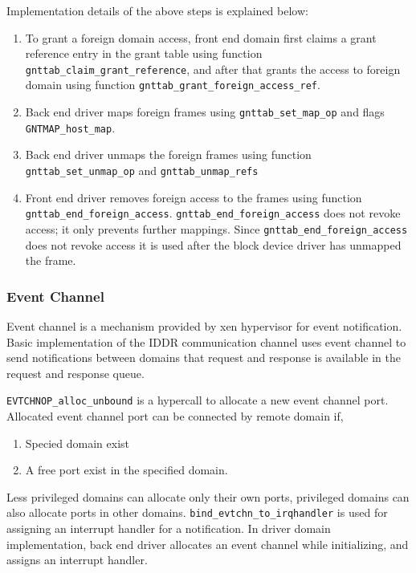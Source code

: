 Implementation details of the above steps is explained below: 
\begin{enumerate}
\item To grant a foreign domain access, front end domain first claims a grant reference entry in the grant table using function \texttt{gnttab\_claim\_grant\_reference}, and after that grants the access to foreign domain using function \texttt{gnttab\_grant\_foreign\_access\_ref}.

\item Back end driver maps foreign frames using \texttt{gnttab\_set\_map\_op} and flags \texttt{GNTMAP\_host\_map}.

\item Back end driver unmaps the foreign frames using function \texttt{gnttab\_set\_unmap\_op} and \texttt{gnttab\_unmap\_refs}
\item Front end driver removes foreign access to the frames using function \texttt{gnttab\_end\_foreign\_access}. \texttt{gnttab\_end\_foreign\_access} does not revoke access; it only prevents further mappings. Since \texttt{gnttab\_end\_foreign\_access} does not revoke access it is used after the block device driver has unmapped the frame\cite{Chisnall:2007:DGX:1407351, Barham:2003:XAV:945445.945462}.
\end{enumerate}

\subsubsection*{Event Channel}
Event channel is a mechanism provided by xen hypervisor for event notification. Basic implementation of the IDDR communication channel uses event channel to send notifications between domains that request and response is available in the request and response queue.


\texttt{EVTCHNOP\_alloc\_unbound} is a hypercall to allocate a new event channel port. Allocated event channel port can be connected by remote domain if,
\begin{enumerate}
\item Specied domain exist
\item A free port exist in the specified domain.
\end{enumerate}
Less privileged domains can allocate only their own ports, privileged domains can also allocate ports in other domains\cite{Chisnall:2007:DGX:1407351, Barham:2003:XAV:945445.945462}. 
\texttt{bind\_evtchn\_to\_irqhandler} is used for assigning an interrupt handler for a notification.
In driver domain implementation, back end driver allocates an event channel while initializing, and assigns an interrupt handler. 

